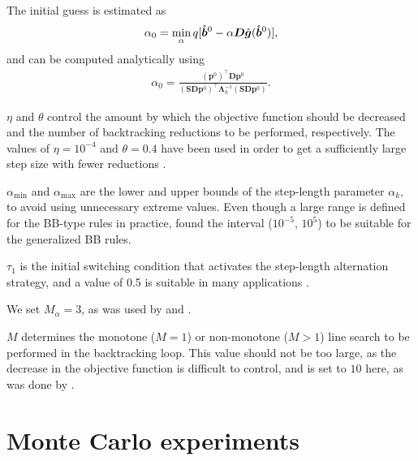 \documentclass[twocolumn]{svjour3}
\begin{document}
\begin{compactitem}
	The initial guess is estimated as
	\begin{align*}
	\alpha_{0} = \operatornamewithlimits{min}_{\alpha} q[\mathring{\bm{b}}^{0} - \alpha \bm{D} \mathring{\bm{g}}(\mathring{\bm{b}}^{0})],
	\end{align*}
	and can be computed analytically using
	\begin{align*}
	\alpha_{0} = \frac{(\bm{p}^{0})^\top\bm{D}\bm{p}^{0}}{(\bm{S}\bm{D}\bm{p}^{0})^\top\bm{\Lambda}_{h}^{-1}(\bm{S}\bm{D}\bm{p}^{0})}.
	\end{align*}
	\item $\eta$ and $\theta$ control the amount by which the objective function should be decreased and the number of backtracking reductions to be performed, respectively. The values of $\eta = 10^{-4}$ and $\theta = 0.4$ have been used in order to get a sufficiently large step size with fewer reductions \citep{Bonettini2009}.
	\item $\alpha_{\text{min}}$ and $\alpha_{\text{max}}$ are the lower and upper bounds of the step-length parameter $\alpha_{k},$ to avoid using unnecessary extreme values. Even though a large range is defined for the BB-type rules in practice, \citet{Bertero2013} found the interval ($10^{-5}$, $10^{5}$) to be suitable for the generalized BB rules.
	\item $\tau_{1}$ is the initial switching condition that activates the step-length alternation strategy, and a value of 0.5 is suitable in many applications \citep{Bonettini2009, Bertero2013}.
	\item We set $M_{\alpha} = 3$, as was used by \citet{Bonettini2009} and \citet{Bertero2013}.
	\item $M$ determines the monotone ($M =1$) or non-monotone ($M > 1$) line search to be performed in the backtracking loop. This value should not be too large, as the decrease in the objective function is difficult to control, and is set to $10$ here, as was done by \citet{Bonettini2009}.
\end{compactitem}

\section{Monte Carlo experiments}
\label{sec:MCNN}
\end{document}
